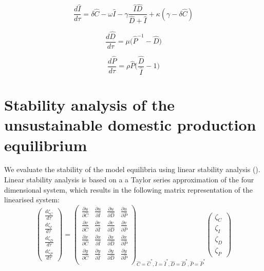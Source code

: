 \documentclass[12pt]{article}
\begin{document}
\begin{equation}
  \frac{d\hat{I}}{d\tau} = \delta \hat{C} - \omega \hat{I} - \gamma \frac{\hat{I}\hat{D}}{\hat{D} + \hat{I}} + \kappa ( \gamma - \delta \hat{C})
\end{equation}

\begin{equation}
  \frac{d\hat{D}}{d\tau } = \mu \Big( \hat{P}^{-1} - \hat{D}\Big)
\end{equation}

\begin{equation}
  \frac{d\hat{P}}{d\tau} = \rho \hat{P}\Big(\frac{\hat{D}}{\hat{I}} - 1\Big)
\end{equation}

\section{Stability analysis of the unsustainable domestic production equilibrium}
We evaluate the stability of the model equilibria using linear stability analysis (\cite{strogatz1994}). Linear stability analysis is based on a a Taylor series approximation of the four dimensional system, which results in the following matrix representation of the linearised system:
%
\begin{equation}
  \begin{pmatrix}
    \frac{d\zeta_{C}}{d\tau} \\
    \frac{d\zeta_{I}}{d\tau} \\
    \frac{d\zeta_{D}}{d\tau} \\
    \frac{d\zeta_{P}}{d\tau}
  \end{pmatrix}
  =
  \begin{pmatrix}
    \frac{\partial u}{\partial \hat{C}} & \frac{\partial u}{\partial \hat{I}} & \frac{\partial u}{\partial \hat{D}} & \frac{\partial u}{\partial \hat{P}}\\
    \frac{\partial v}{\partial \hat{C}} & \frac{\partial v}{\partial \hat{I}} & \frac{\partial v}{\partial \hat{D}} & \frac{\partial v}{\partial \hat{P}}\\
    \frac{\partial x}{\partial \hat{C}} & \frac{\partial x}{\partial \hat{I}} & \frac{\partial x}{\partial \hat{D}} & \frac{\partial x}{\partial \hat{P}}\\
    \frac{\partial y}{\partial \hat{C}} & \frac{\partial y}{\partial \hat{I}} & \frac{\partial y}{\partial \hat{D}} & \frac{\partial y}{\partial \hat{P}}\\
  \end{pmatrix}_{\hat{C}=\hat{C}^{*}, \hat{I}=\hat{I}^{*}, \hat{D}=\hat{D}^{*}, \hat{P}=\hat{P}^{*}}
  \begin{pmatrix}
    \zeta_{C} \\
    \zeta_{I}  \\
    \zeta_{D}  \\
    \zeta_{P}
  \end{pmatrix}
\end{equation}
\end{document}
